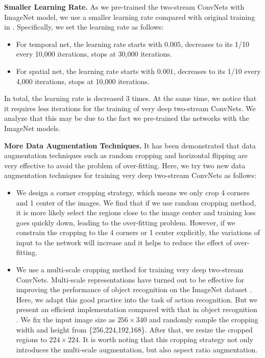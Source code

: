 \documentclass[10pt,twocolumn,letterpaper]{article}
\begin{document}
\textbf{Smaller Learning Rate.} As we pre-trained the two-stream ConvNets with ImageNet model, we use a smaller learning rate compared with original training in \cite{SimonyanZ14}. Specifically, we set the learning rate as follows:
\begin{itemize}
  \item For temporal net, the learning rate starts with $0.005$, decreases to its 1/10 every 10,000 iterations, stops at 30,000 iterations.
  \item For spatial net, the learning rate starts with $0.001$, decreases to its 1/10 every 4,000 iterations, stops at 10,000 iterations.
\end{itemize}
In total, the learning rate is decreased 3 times. At the same time, we notice that it requires less iterations for the training of very deep two-stream ConvNets. We analyze that this may be due to the fact we pre-trained the networks with the ImageNet models.

\textbf{More Data Augmentation Techniques.} It has been demonstrated that data augmentation techniques such as random cropping and horizontal flipping are very effective to avoid the problem of over-fitting. Here, we try two new data augmentation techniques for training very deep two-stream ConvNets as follows:
\begin{itemize}
  \item We design a corner cropping strategy, which means we only crop 4 corners and 1 center of the images. We find that if we use random cropping method, it is more likely select the regions close to the image center and training loss goes quickly down, leading to the over-fitting problem. However, if we constrain the cropping to the 4 corners or 1 center explicitly, the variations of input to the network will increase and it helps to reduce the effect of over-fitting.
  \item We use a multi-scale cropping method for training very deep two-stream ConvNets. Multi-scale representations have turned out to be effective for improving the performance of object recognition on the ImageNet dataset \cite{SimonyanZ14a}. Here, we adapt this good practice into the task of action recognition. But we present an efficient implementation compared with that in object recognition \cite{SimonyanZ14a}. We fix the input image size as $256 \times 340$ and randomly sample the cropping width and height from \{256,224,192,168\}. After that, we resize the cropped regions to $224 \times 224$. It is worth noting that this cropping strategy not only introduces the multi-scale augmentation, but also aspect ratio augmentation.
\end{itemize}
\end{document}
